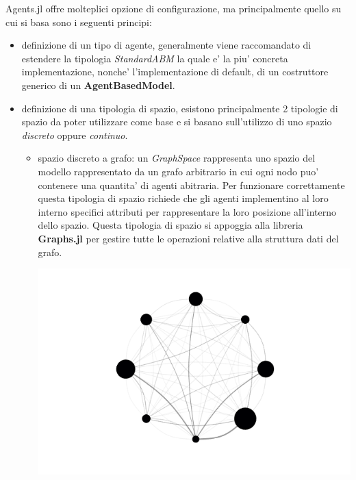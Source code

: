 Agents.jl offre molteplici opzione di configurazione, ma 
principalmente quello su cui si basa sono i seguenti principi:

\begin{itemize}
    \item definizione di un tipo di agente, generalmente viene raccomandato di 
    estendere la tipologia \emph{StandardABM} la quale e' la piu' concreta implementazione,
    nonche' l'implementazione di default, di un costruttore generico di un \textbf{AgentBasedModel}.
    \item definizione di una tipologia di spazio, esistono principalmente 2 tipologie 
    di spazio da poter utilizzare come base e si basano sull'utilizzo di uno spazio \emph{discreto}
    oppure \emph{continuo}.
    \begin{itemize}
        \item spazio discreto a grafo: un \emph{GraphSpace} rappresenta uno spazio del modello
        rappresentato da un grafo arbitrario in cui ogni nodo puo' contenere una 
        quantita' di agenti abitraria. Per funzionare correttamente questa tipologia di 
        spazio richiede che gli agenti implementino al loro interno specifici attributi
        per rappresentare la loro posizione all'interno dello spazio. Questa tipologia di spazio
        si appoggia alla libreria \textbf{Graphs.jl} \cite{Graphs2021} per gestire tutte le operazioni relative
        alla struttura dati del grafo.  

        \begin{minipage}{\linewidth}
            \centering
            \includegraphics[width=\textwidth]{img/graph.png}
            \label{fig:graphspace_representation}
        \end{minipage}
        

\end{itemize}
\end{itemize}
